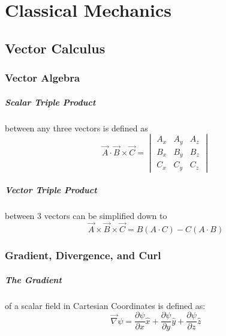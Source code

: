 \chapter{Classical Mechanics}



\section{Vector Calculus}


\subsection{Vector Algebra}

\paragraph{Scalar Triple Product} between any three vectors is defined as 
\begin{equation*} \vec{A} \cdot \vec{B} \times \vec{C} = \begin{vmatrix}A_x & A_y & A_z \\ B_x & B_y & B_z \\ C_x & C_y & C_z\end{vmatrix} \end{equation*}
\paragraph{Vector Triple Product} between 3 vectors can be simplified down to
\begin{equation*} \vec{A} \times \vec{B} \times \vec{C} = B(A \cdot C)-C(A \cdot B) \end{equation*}

\subsection{Gradient, Divergence, and Curl}

\paragraph{The Gradient} of a scalar field in Cartesian Coordinates is defined as:
\begin{equation}
    \vec{\nabla} \psi = \frac{\partial \psi}{\partial x} \hat{x} + \frac{\partial \psi}{\partial y} \hat{y} + \frac{\partial \psi}{\partial z} \hat{z}
\end{equation}

